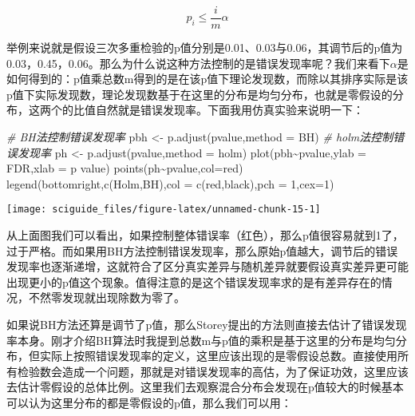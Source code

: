 \documentclass[]{tufte-book}
\newenvironment{Shaded}{}{}
\newcommand{\AttributeTok}[1]{\textcolor[rgb]{0.49,0.56,0.16}{#1}}
\newcommand{\CommentTok}[1]{\textcolor[rgb]{0.38,0.63,0.69}{\textit{#1}}}
\newcommand{\DecValTok}[1]{\textcolor[rgb]{0.25,0.63,0.44}{#1}}
\newcommand{\FunctionTok}[1]{\textcolor[rgb]{0.02,0.16,0.49}{#1}}
\newcommand{\NormalTok}[1]{#1}
\newcommand{\OtherTok}[1]{\textcolor[rgb]{0.00,0.44,0.13}{#1}}
\newcommand{\SpecialCharTok}[1]{\textcolor[rgb]{0.25,0.44,0.63}{#1}}
\newcommand{\StringTok}[1]{\textcolor[rgb]{0.25,0.44,0.63}{#1}}
\begin{document}
\[
p_i \leq \frac{i}{m} \alpha
\]

举例来说就是假设三次多重检验的p值分别是0.01、0.03与0.06，其调节后的p值为0.03，0.45，0.06。那么为什么说这种方法控制的是错误发现率呢？我们来看下\(\alpha\)是如何得到的：p值乘总数m得到的是在该p值下理论发现数，而除以其排序实际是该p值下实际发现数，理论发现数基于在这里的分布是均匀分布，也就是零假设的分布，这两个的比值自然就是错误发现率。下面我用仿真实验来说明一下：

\begin{Shaded}
\begin{Highlighting}[]
\CommentTok{\# BH法控制错误发现率}
\NormalTok{pbh }\OtherTok{\textless{}{-}} \FunctionTok{p.adjust}\NormalTok{(pvalue,}\AttributeTok{method =} \StringTok{\textquotesingle{}BH\textquotesingle{}}\NormalTok{)}
\CommentTok{\# holm法控制错误发现率}
\NormalTok{ph }\OtherTok{\textless{}{-}} \FunctionTok{p.adjust}\NormalTok{(pvalue,}\AttributeTok{method =} \StringTok{\textquotesingle{}holm\textquotesingle{}}\NormalTok{)}
\FunctionTok{plot}\NormalTok{(pbh}\SpecialCharTok{\textasciitilde{}}\NormalTok{pvalue,}\AttributeTok{ylab =} \StringTok{\textquotesingle{}FDR\textquotesingle{}}\NormalTok{,}\AttributeTok{xlab =} \StringTok{\textquotesingle{}p value\textquotesingle{}}\NormalTok{)}
\FunctionTok{points}\NormalTok{(ph}\SpecialCharTok{\textasciitilde{}}\NormalTok{pvalue,}\AttributeTok{col=}\StringTok{\textquotesingle{}red\textquotesingle{}}\NormalTok{)}
\FunctionTok{legend}\NormalTok{(}\StringTok{\textquotesingle{}bottomright\textquotesingle{}}\NormalTok{,}\FunctionTok{c}\NormalTok{(}\StringTok{\textquotesingle{}Holm\textquotesingle{}}\NormalTok{,}\StringTok{\textquotesingle{}BH\textquotesingle{}}\NormalTok{),}\AttributeTok{col =} \FunctionTok{c}\NormalTok{(}\StringTok{\textquotesingle{}red\textquotesingle{}}\NormalTok{,}\StringTok{\textquotesingle{}black\textquotesingle{}}\NormalTok{),}\AttributeTok{pch =} \DecValTok{1}\NormalTok{,}\AttributeTok{cex=}\DecValTok{1}\NormalTok{)}
\end{Highlighting}
\end{Shaded}

\texttt{[image: sciguide\_files/figure-latex/unnamed-chunk-15-1]}

从上面图我们可以看出，如果控制整体错误率（红色），那么p值很容易就到1了，过于严格。而如果用BH方法控制错误发现率，那么原始p值越大，调节后的错误发现率也逐渐递增，这就符合了区分真实差异与随机差异就要假设真实差异更可能出现更小的p值这个现象。值得注意的是这个错误发现率求的是有差异存在的情况，不然零发现就出现除数为零了。

如果说BH方法还算是调节了p值，那么Storey提出的方法则直接去估计了错误发现率本身。刚才介绍BH算法时我提到总数m与p值的乘积是基于这里的分布是均匀分布，但实际上按照错误发现率的定义，这里应该出现的是零假设总数。直接使用所有检验数会造成一个问题，那就是对错误发现率的高估，为了保证功效，这里应该去估计零假设的总体比例。这里我们去观察混合分布会发现在p值较大的时候基本可以认为这里分布的都是零假设的p值，那么我们可以用：
\end{document}
